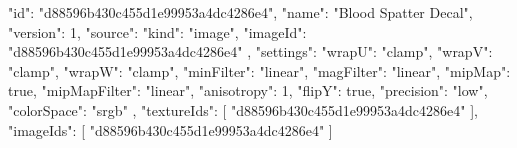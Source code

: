 {
  "id": "d88596b430c455d1e99953a4dc4286e4",
  "name": "Blood Spatter Decal",
  "version": 1,
  "source": {
    "kind": "image",
    "imageId": "d88596b430c455d1e99953a4dc4286e4"
  },
  "settings": {
    "wrapU": "clamp",
    "wrapV": "clamp",
    "wrapW": "clamp",
    "minFilter": "linear",
    "magFilter": "linear",
    "mipMap": true,
    "mipMapFilter": "linear",
    "anisotropy": 1,
    "flipY": true,
    "precision": "low",
    "colorSpace": "srgb"
  },
  "textureIds": [
    "d88596b430c455d1e99953a4dc4286e4"
  ],
  "imageIds": [
    "d88596b430c455d1e99953a4dc4286e4"
  ]
}
